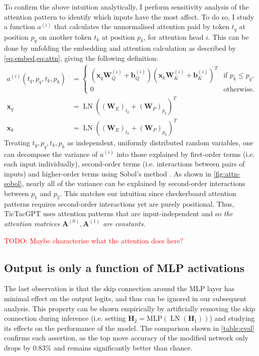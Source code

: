 \documentclass{article}
\newcommand{\todo}[1]{\textcolor{red}{TODO: #1}}
\newcommand{\ttgpt}{TicTacGPT\xspace}
\renewcommand{\v}[1]{\mathbf{\bm{#1}}}
\newcommand{\m}[1]{\mathbf{\bm{#1}}}
\DeclareMathOperator{\layernorm}{LN}
\begin{document}
To confirm the above intuition analytically, I perform sensitivity analysis of the attention pattern to identify which inputs have the most affect. To do so, I study a function $a^{(i)}$ that calculates the unnormalised attention paid by token $t_q$ at position $p_q$ on another token $t_k$ at position $p_k$, for attention head $i$. This can be done by unfolding the embedding and attention calculation as described by \cref{eq:embed,eq:attn}, giving the following definition:
\begin{equation*}
    \begin{aligned}
        a^{(i)}(t_q, p_q, t_k, p_k)
         & =\begin{cases}
                \left(\v{x}_q \m{W}_Q^{(i)} + \v{b}_Q^{(i)}\right)
                \left(\v{x}_k \m{W}_K^{(i)} + \v{b}_K^{(i)}\right)^T
                  & \text{if }p_k \leq p_q, \\
                0 & \text{otherwise.}
            \end{cases} \\
        \v{x}_q
         & = \layernorm((\m{W}_E)_{t_q} + (\m{W}_P)_{p_q})^T    \\
        \v{x}_k
         & = \layernorm((\m{W}_E)_{t_k} + (\m{W}_P)_{p_k})^T
    \end{aligned}
\end{equation*}
Treating $t_q, p_q, t_k, p_k$ as independent, uniformly distributed random variables, one can decompose the variance of $a^{(i)}$ into those explained by first-order terms (i.e. each input individually), second-order terms (i.e. interactions between pairs of inputs) and higher-order terms using Sobol's method \citep{sobol1993sensitivity,sobol2001global}. As shown in \cref{fig:attn-sobol}, nearly all of the variance can be explained by second-order interactions between $p_1$ and $p_2$. This matches our intuition since checkerboard attention patterns requires second-order interactions yet are purely positional. Thus, \ttgpt uses attention patterns that are input-independent and so \emph{the attention matrices $\m{A}^{(0)}, \m{A}^{(1)}$ are constants}.

\todo{Maybe characterise what the attention does here?}

\subsection{Output is only a function of MLP activations} \label{sec:simplify-output}

The last observation is that the skip connection around the MLP layer has minimal effect on the output logits, and thus can be ignored in our subsequent analysis. This property can be shown empirically by artificially removing the skip connection during inference (i.e. setting $\m{H}_2 = \text{MLP}(\layernorm(\m{H}_1))$) and studying its effects on the performance of the model. The comparison shown in \cref{table:eval} confirms such assertion, as the top move accuracy of the modified network only drops by $0.83\%$ and remains significantly better than chance.
\end{document}
